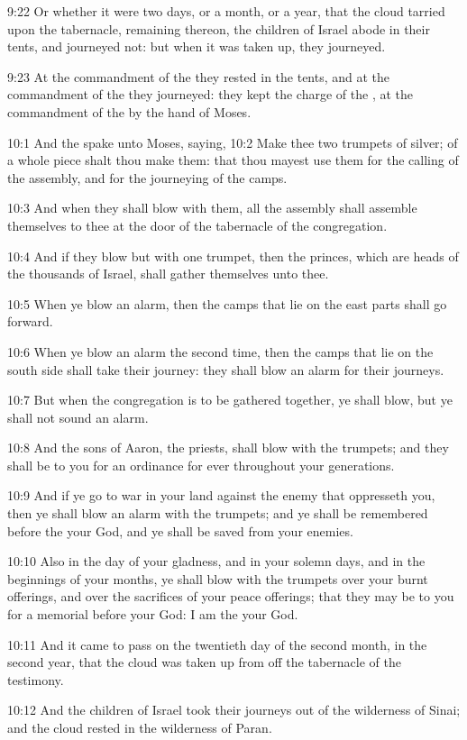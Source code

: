 9:22 Or whether it were two days, or a month, or a year, that the cloud tarried upon the tabernacle, remaining thereon, the children of Israel abode in their tents, and journeyed not: but when it was taken up, they journeyed.

9:23 At the commandment of the \LORD they rested in the tents, and at the commandment of the \LORD they journeyed: they kept the charge of the \LORD, at the commandment of the \LORD by the hand of Moses.

10:1 And the \LORD spake unto Moses, saying, 10:2 Make thee two trumpets of silver; of a whole piece shalt thou make them: that thou mayest use them for the calling of the assembly, and for the journeying of the camps.

10:3 And when they shall blow with them, all the assembly shall assemble themselves to thee at the door of the tabernacle of the congregation.

10:4 And if they blow but with one trumpet, then the princes, which are heads of the thousands of Israel, shall gather themselves unto thee.

10:5 When ye blow an alarm, then the camps that lie on the east parts shall go forward.

10:6 When ye blow an alarm the second time, then the camps that lie on the south side shall take their journey: they shall blow an alarm for their journeys.

10:7 But when the congregation is to be gathered together, ye shall blow, but ye shall not sound an alarm.

10:8 And the sons of Aaron, the priests, shall blow with the trumpets; and they shall be to you for an ordinance for ever throughout your generations.

10:9 And if ye go to war in your land against the enemy that oppresseth you, then ye shall blow an alarm with the trumpets; and ye shall be remembered before the \LORD your God, and ye shall be saved from your enemies.

10:10 Also in the day of your gladness, and in your solemn days, and in the beginnings of your months, ye shall blow with the trumpets over your burnt offerings, and over the sacrifices of your peace offerings; that they may be to you for a memorial before your God: I am the \LORD your God.

10:11 And it came to pass on the twentieth day of the second month, in the second year, that the cloud was taken up from off the tabernacle of the testimony.

10:12 And the children of Israel took their journeys out of the wilderness of Sinai; and the cloud rested in the wilderness of Paran.

